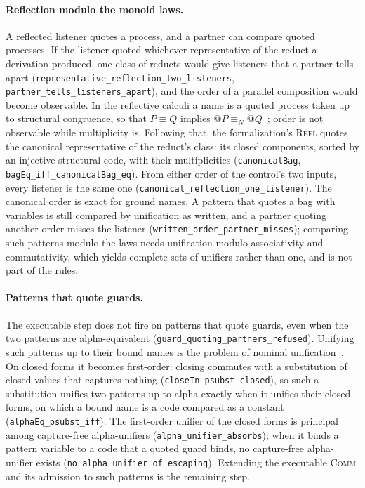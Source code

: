 \documentclass[11pt]{article}
\theoremstyle{definition}
\theoremstyle{remark}
\begin{document}
\paragraph{Reflection modulo the monoid laws.}
A reflected listener quotes a process, and a partner can compare quoted
processes.  If the listener quoted whichever representative of the reduct
a derivation produced, one class of reducts would give listeners that a
partner tells apart (\texttt{representative\_reflection\_two\_listeners},
\texttt{partner\_tells\_listeners\_apart}), and the order of a parallel
composition would become observable.  In the reflective
calculi a name is a quoted process taken up to structural congruence, so
that $P \equiv Q$ implies $@P \equiv_N @Q$~\cite{MeredithRadestock2005};
order is not observable while multiplicity is.  Following that, the
formalization's \textsc{Refl} quotes the canonical representative of the
reduct's class: its closed components, sorted by an injective structural
code, with their multiplicities (\texttt{canonicalBag},
\texttt{bagEq\_iff\_canonicalBag\_eq}).  From either order of the control's
two inputs, every listener is the same one
(\texttt{canonical\_reflection\_one\_listener}).  The canonical order is
exact for ground names.  A pattern that quotes a bag with variables is
still compared by unification as written, and a partner quoting another
order misses the listener (\texttt{written\_order\_partner\_misses});
comparing such patterns modulo the laws needs unification modulo
associativity and commutativity, which yields complete sets of unifiers
rather than one, and is not part of the rules.

\paragraph{Patterns that quote guards.}
The executable step does not fire on patterns that quote guards, even when
the two patterns are alpha-equivalent
(\texttt{guard\_quoting\_partners\_refused}).  Unifying such patterns up to
their bound names is the problem of nominal unification~\cite{Pitts2003}.
On closed forms it becomes first-order: closing commutes with a
substitution of closed values that captures nothing
(\texttt{closeIn\_psubst\_closed}), so such a substitution unifies two
patterns up to alpha exactly when it unifies their closed forms, on which a
bound name is a code compared as a constant
(\texttt{alphaEq\_psubst\_iff}).  The first-order unifier of the closed
forms is principal among capture-free alpha-unifiers
(\texttt{alpha\_unifier\_absorbs}); when it binds a pattern variable to a
code that a quoted guard binds, no capture-free alpha-unifier exists
(\texttt{no\_alpha\_unifier\_of\_escaping}).  Extending the executable
\textsc{Comm} and its admission to such patterns is the remaining step.
\end{document}
